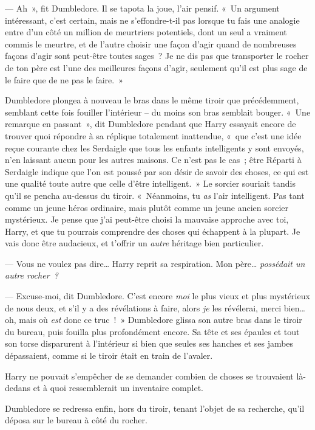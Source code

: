 --- Ah~», fit Dumbledore.
Il se tapota la joue, l'air pensif.
«~Un argument intéressant, c'est certain, mais ne s'effondre-t-il pas lorsque tu fais une analogie entre d'un côté un million de meurtriers potentiels, dont un seul a vraiment commis le meurtre, et de l'autre choisir une façon d'agir quand de nombreuses façons d'agir sont peut-être toutes sages~?
Je ne dis pas que transporter le rocher de ton père est l'une des meilleures façons d'agir, seulement qu'il est plus sage de le faire que de ne pas le faire.~»

Dumbledore plongea à nouveau le bras dans le même tiroir que précédemment, semblant cette fois fouiller l'intérieur -- du moins son bras semblait bouger.
«~Une remarque en passant~», dit Dumbledore pendant que Harry essayait encore de trouver quoi répondre à sa réplique totalement inattendue, «~que c'est une idée reçue courante chez les Serdaigle que tous les enfants intelligents y sont envoyés, n'en laissant aucun pour les autres maisons.
Ce n'est pas le cas~; être Réparti à Serdaigle indique que l'on est poussé par son désir de savoir des choses, ce qui est une qualité toute autre que celle d'être intelligent.~»
Le sorcier souriait tandis qu'il se pencha au-dessus du tiroir.
«~Néanmoins, tu \emph{as} l'air intelligent.
Pas tant comme un jeune héros ordinaire, mais plutôt comme un jeune ancien sorcier mystérieux.
Je pense que j'ai peut-être choisi la mauvaise approche avec toi, Harry, et que tu pourrais comprendre des choses qui échappent à la plupart.
Je vais donc être audacieux, et t'offrir un \emph{autre} héritage bien particulier.

--- Vous ne voulez pas dire… Harry reprit sa respiration.
Mon père… \emph{possédait un autre rocher~?}

--- Excuse-moi, dit Dumbledore.
C'est encore \emph{moi} le plus vieux et plus mystérieux de nous deux, et s'il y a des révélations à faire, alors \emph{je} les révélerai, merci bien… oh, mais où \emph{est} donc ce truc~!~»
Dumbledore glissa son autre bras dans le tiroir du bureau, puis fouilla plus profondément encore.
Sa tête et ses épaules et tout son torse disparurent à l'intérieur si bien que seules ses hanches et ses jambes dépassaient, comme si le tiroir était en train de l'avaler.

Harry ne pouvait s'empêcher de se demander combien de choses se trouvaient là-dedans et à quoi ressemblerait un inventaire complet.

Dumbledore se redressa enfin, hors du tiroir, tenant l'objet de sa recherche, qu'il déposa sur le bureau à côté du rocher.

